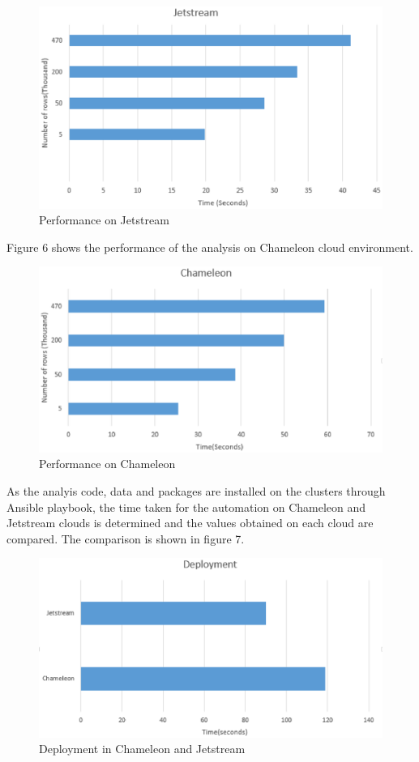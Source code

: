 \documentclass[9pt,twocolumn,twoside]{../../styles/osajnl}
\begin{document}
\begin{figure}[ht]
  \includegraphics[scale=0.50]{images/jsBench.eps}
  \caption{Performance on Jetstream}
\end{figure}

Figure 6 shows the performance of the analysis on Chameleon cloud
environment.

\begin{figure}[ht]
  \includegraphics[scale=0.50]{images/ccBench.eps}
  \caption{Performance on Chameleon}
\end{figure}

As the analyis code, data and packages are installed on the clusters
through Ansible playbook, the time taken for the automation on
Chameleon and Jetstream clouds is determined and the values obtained
on each cloud are compared. The comparison is shown in figure 7.

\begin{figure}[ht]
  \includegraphics[scale=0.50]{images/CcVsJs.eps}
  \caption{Deployment in Chameleon and Jetstream}
\end{figure}
\end{document}
